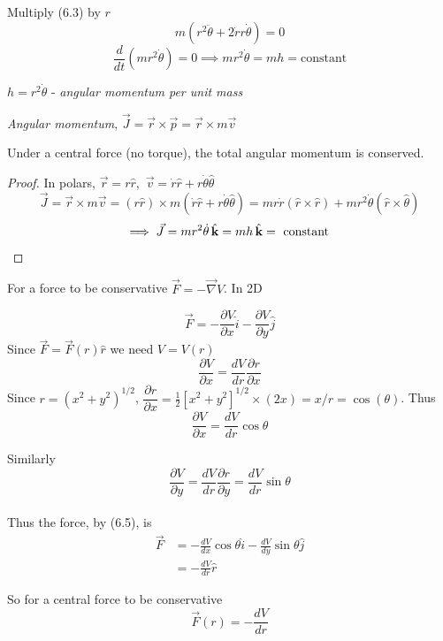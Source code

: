 \documentclass[10pt]{scrartcl}
\begin{document}
Multiply (6.3) by $r$
\[m(r^2\ddot{\theta} + 2\dot{r}r\dot{\theta}) = 0\]
\[\frac{d}{dt}(mr^2\dot{\theta}) = 0 \implies mr^2\dot{\theta} = mh = \text{constant}\]
\begin{definition}
$h = r^2\dot{\theta}$ - \emph{angular momentum per unit mass}

\emph{Angular momentum}, $\vec{J} = \vec{r} \times \vec{p} = \vec{r} \times m \vec{v}$
\end{definition}
\begin{theorem}
	Under a central force (no torque), the total angular momentum is conserved.
\end{theorem}

\begin{proof}
In polars, $\vec{r} = r\hat{r}$,~$\vec{v} = \dot{r}\hat{r} + r\dot{\theta}\hat{\theta}$
\[\vec{J} = \vec{r} \times m\vec{v} = (r\hat{r}) \times m(\dot{r}\hat{r} + r\dot{\theta}\hat{\theta}) = mr\dot{r}(\hat{r}\times\hat{r}) + mr^2\dot{\theta}(\hat{r} \times \hat{\theta}) \]
\[\implies \vec{J} =  mr^2\dot{\theta}\hat{k} = mh\hat{k} = \text{ constant }\qedhere\]
\end{proof}



For a force to be conservative $\vec{F} = -\vec{\nabla}V$. In 2D

\begin{equation}\vec{F} = -\frac{\partial V}{\partial x}\hat{i} - \frac{\partial V}{\partial y}\hat{j}\end{equation}
Since $\vec{F} = \vec{F}(r)\hat{r}$ we need $V = V(r)$
\[\frac{\partial V}{\partial x} = \frac{dV}{dr}\frac{\partial r}{\partial x}\]
Since $r = (x^2 + y^2)^{1/2}$, $\dfrac{\partial r}{\partial x} = \frac{1}{2}[x^2 + y^2]^{1/2}\times(2x) = x/r = \cos(\theta)$.
Thus 
\[\frac{\partial V}{\partial x} = \frac{dV}{dr}\cos\theta\]

Similarly \[\frac{\partial V}{\partial y} = \frac{dV}{dr}\frac{\partial r}{\partial y} = \frac{dV}{dr}\sin\theta\]~\\

Thus the force, by (6.5), is
\[\begin{aligned}\vec{F} &= -\frac{dV}{dx}\cos\theta\hat{i} - \frac{dV}{dy}\sin\theta\hat{j}\\
 &= -\frac{dV}{dr}\hat{r}
\end{aligned}
\]

So for a central force to be conservative
\[\vec{F}(r) = -\frac{dV}{dr}\]
\end{document}
